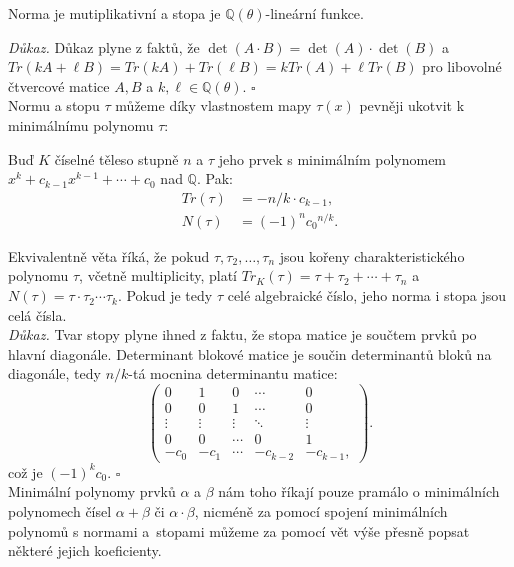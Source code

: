 \documentclass [12pt]{report}
\begin{document}
\begin{veta}
Norma je mutiplikativní a stopa je $\mathbb{Q}(\theta)$-lineární funkce.
\end{veta}
\noindent \textit{Důkaz.} Důkaz plyne z faktů, že $\det(A \cdot B) = \det(A) \cdot \det(B)$ a $Tr(kA+\ell B) = Tr(kA) + Tr(\ell B) = kTr(A)+\ell Tr(B)$ pro libovolné čtvercové matice $A,B$ a $k,\ell \in \mathbb{Q}(\theta)$. \hfill $\square$\\

Normu a stopu $\tau$ můžeme díky vlastnostem mapy $\tau(x)$ pevněji ukotvit k minimálnímu polynomu $\tau$:

\begin{veta}
Buď $K$ číselné těleso stupně $n$ a $\tau$ jeho prvek s minimálním polynomem $x^k + c_{k-1} x^{k-1} + \cdots  + c_0$ nad $\mathbb{Q}$. Pak:
\begin{align*}
Tr(\tau) &= - n/k \cdot c_{k-1},\\
N(\tau) &= (-1)^n {c_0}^{n/k}.
\end{align*} 
\end{veta}

Ekvivalentně věta říká, že pokud $\tau, \tau_2,\dots,\tau_n$ jsou kořeny charakteristického polynomu $\tau$, včetně multiplicity, platí $Tr_K(\tau) = \tau + \tau_2+\cdots+\tau_n$ a $N(\tau) = \tau \cdot \tau_2 \cdots \tau_k$. Pokud je tedy $\tau$ celé algebraické číslo, jeho norma i stopa jsou celá čísla.\\

\noindent\textit{Důkaz.} Tvar stopy plyne ihned z faktu, že stopa matice je součtem prvků po hlavní diagonále.  Determinant blokové matice je součin determinantů bloků na diagonále, tedy $n/k$-tá mocnina determinantu matice:
\begin{equation*}
 \begin{pmatrix}
0 & 1 & 0 & \cdots & 0\\
0 & 0 & 1 & \cdots & 0\\
\vdots & \vdots & \vdots & \ddots &\vdots\\
0 & 0 & \cdots & 0& 1\\
-c_0 & -c_1 & \cdots & -c_{k-2} & -c_{k-1},
\end{pmatrix}.
\end{equation*}
což je $(-1)^k c_{0}$. \hfill $\square$\\

Minimální polynomy prvků $\alpha$ a $\beta$ nám toho říkají pouze pramálo o minimálních polynomech čísel $\alpha+\beta$ či $\alpha \cdot \beta$, nicméně za pomocí spojení minimálních polynomů s normami a~stopami můžeme za pomocí vět výše přesně popsat některé jejich koeficienty.\\
\end{document}
